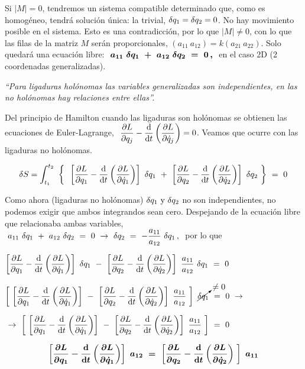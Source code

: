 Si $|M|=0$, tendremos un sistema compatible determinado que, como es homogéneo, tendrá solución única: la trivial, $\var q_1 = \var q_2=0$. No hay movimiento posible en el sistema. Esto es una contradicción, por lo que $|M| \neq 0$, con lo que las filas de la matriz $M$ serán proporcionales, $(a_{11} \ a_{12}) = k (a_{21} \ a_{22})$. Solo quedará una ecuación libre: $\boldsymbol{ \  a_{11} \ \var q_1 \ + \   a_{12} \ \var q_2 \ = \  0\, , \  }$ en el caso 2D (2 coordenadas generalizadas). 

\emph{``Para ligaduras holónomas las variables generalizadas son independientes, en las no holónomas hay relaciones entre ellas''.}

Del principio de Hamilton cuando las ligaduras son holónomas se obtienen las ecuaciones de Euler-Lagrange, $\ \displaystyle \pdv{L}{q_j} - \dv{t} \left( \pdv{L}{\dot q_j} \right)  = 0$. Veamos que ocurre con las ligaduras no holónomas.

$$ \displaystyle \var S = \int_{t_1}^{t_2} \ \left\{ \ \ 
\left[ \pdv{L}{q_1} - \dv{t} \left( \pdv{L}{\dot q_1} \right) \right] \ \var q_1 \ + \ 
\left[ \pdv{L}{q_2} - \dv{t}  \left( \pdv{L}{\dot q_2} \right) \right] \ \var q_2
 \ \right\} \ = \ 0 $$
 
 Como ahora (ligaduras no holónomas) $\var q_1 \text{ y } \var q_2$ no son independientes, no podemos exigir que ambos integrandos sean cero. Despejando de la ecuación libre que relacionaba ambas variables, $\ a_{11} \ \var q_1 \ + \   a_{12} \ \var q_2 \ = \  0 \ \to \ \var q_2 \ = \ -\dfrac {a_{11}}{a_{12}} \ \var q_1 \, , \ $ por lo que
 
 
$\displaystyle \left[ \pdv{L}{q_1} - \dv{t} \left( \pdv{L}{\dot q_1} \right) \right] \ \var q_1 \ - \ 
\left[ \pdv{L}{q_2} - \dv{t} \left( \pdv{L}{\dot q_2} \right) \right] \ \dfrac {a_{11}}{a_{12}} \ \var q_1 \ = \ 0 $

$\displaystyle \left[ \ 
\left[ \pdv{L}{q_1} - \dv{t} \left( \pdv{L}{\dot q_1} \right) \right] \ - \ 
\left[ \pdv{L}{q_2} - \dv{t} \left( \pdv{L}{\dot q_2} \right) \right] \ \dfrac {a_{11}}{a_{12}} \ \right] \ 
 \cancelto{\neq 0}{\var q_1} \ = \ 0  \ \to$
 
 $\displaystyle \ \to \ 
 \left[ \ 
\left[ \pdv{L}{q_1} - \dv{t} \left( \pdv{L}{\dot q_1} \right) \right] \ - \ 
\left[ \pdv{L}{q_2} - \dv{t} \left( \pdv{L}{\dot q_2} \right) \right] \ \dfrac {a_{11}}{a_{12}} \ \right] \ = \ 0$

$$\boldsymbol{
\displaystyle \left[ \pdv{L}{q_1} - \dv{t} \left( \pdv{L}{\dot q_1} \right) \right] \ a_{12} \ = \ 
\left[ \pdv{L}{q_2} - \dv{t} \left( \pdv{L}{\dot q_2} \right) \ \right] \ a_{11}  }$$

